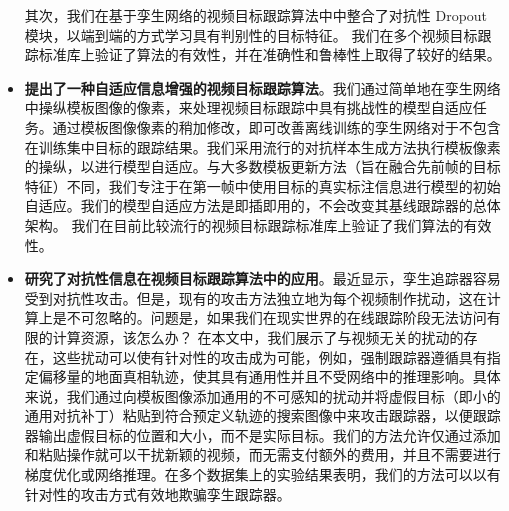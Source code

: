 \begin{itemize}
其次，我们在基于孪生网络的视频目标跟踪算法中中整合了对抗性 Dropout 模块，以端到端的方式学习具有判别性的目标特征。
我们在多个视频目标跟踪标准库上验证了算法的有效性，并在准确性和鲁棒性上取得了较好的结果。
\item \textbf{提出了一种自适应信息增强的视频目标跟踪算法}。我们通过简单地在孪生网络中操纵模板图像的像素，来处理视频目标跟踪中具有挑战性的模型自适应任务。通过模板图像像素的稍加修改，即可改善离线训练的孪生网络对于不包含在训练集中目标的跟踪结果。我们采用流行的对抗样本生成方法执行模板像素的操纵，以进行模型自适应。与大多数模板更新方法（旨在融合先前帧的目标特征）不同，我们专注于在第一帧中使用目标的真实标注信息进行模型的初始自适应。我们的模型自适应方法是即插即用的，不会改变其基线跟踪器的总体架构。
我们在目前比较流行的视频目标跟踪标准库上验证了我们算法的有效性。
\item \textbf{研究了对抗性信息在视频目标跟踪算法中的应用}。最近显示，孪生追踪器容易受到对抗性攻击。但是，现有的攻击方法独立地为每个视频制作扰动，这在计算上是不可忽略的。问题是，如果我们在现实世界的在线跟踪阶段无法访问有限的计算资源，该怎么办？
在本文中，我们展示了与视频无关的扰动的存在，这些扰动可以使有针对性的攻击成为可能，例如，强制跟踪器遵循具有指定偏移量的地面真相轨迹，使其具有通用性并且不受网络中的推理影响。具体来说，我们通过向模板图像添加通用的不可感知的扰动并将虚假目标（即小的通用对抗补丁）粘贴到符合预定义轨迹的搜索图像中来攻击跟踪器，以便跟踪器输出虚假目标的位置和大小，而不是实际目标。我们的方法允许仅通过添加和粘贴操作就可以干扰新颖的视频，而无需支付额外的费用，并且不需要进行梯度优化或网络推理。在多个数据集上的实验结果表明，我们的方法可以以有针对性的攻击方式有效地欺骗孪生跟踪器。
\end{itemize}

